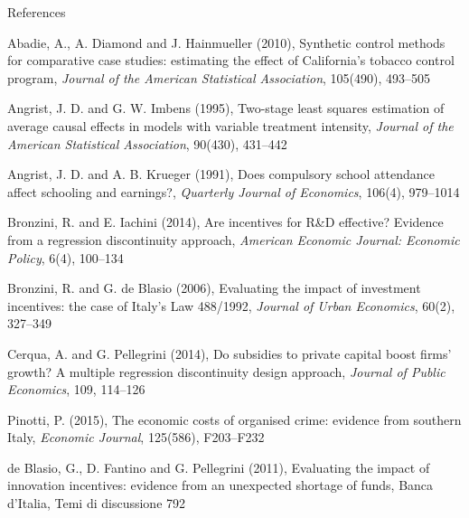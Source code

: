 \documentclass[aspectratio=169,xcolor=table]{beamer}
\begin{document}
\begin{frame}{References}
\tiny
\bi
  \item Abadie, A., A. Diamond and J. Hainmueller (2010), Synthetic control methods for comparative case studies: estimating the effect of California's tobacco control program, \textit{Journal of the American Statistical Association}, 105(490), 493--505
  \item Angrist, J. D. and G. W. Imbens (1995), Two-stage least squares estimation of average causal effects in models with variable treatment intensity, \textit{Journal of the American Statistical Association}, 90(430), 431--442
  \item Angrist, J. D. and A. B. Krueger (1991), Does compulsory school attendance affect schooling and earnings?, \textit{Quarterly Journal of Economics}, 106(4), 979--1014
  \item Bronzini, R. and E. Iachini (2014), Are incentives for R\&D effective? Evidence from a regression discontinuity approach, \textit{American Economic Journal: Economic Policy}, 6(4), 100--134
  \item Bronzini, R. and G. de Blasio (2006), Evaluating the impact of investment incentives: the case of Italy's Law 488/1992, \textit{Journal of Urban Economics}, 60(2), 327--349
  \item Cerqua, A. and G. Pellegrini (2014), Do subsidies to private capital boost firms' growth? A multiple regression discontinuity design approach, \textit{Journal of Public Economics}, 109, 114--126
  \item Pinotti, P. (2015), The economic costs of organised crime: evidence from southern Italy, \textit{Economic Journal}, 125(586), F203--F232
  \item de Blasio, G., D. Fantino and G. Pellegrini (2011), Evaluating the impact of innovation incentives: evidence from an unexpected shortage of funds, Banca d'Italia, Temi di discussione 792
\ei
\end{frame}

\pelQuestions
\end{document}
